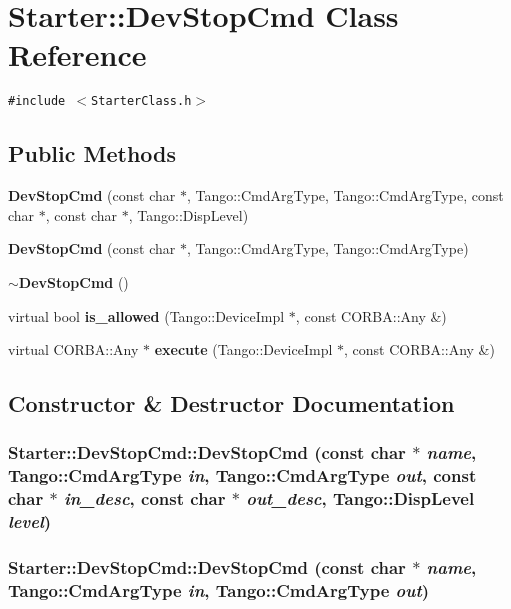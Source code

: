 \section{Starter::Dev\-Stop\-Cmd  Class Reference}
\label{classStarter_1_1DevStopCmd}
{\tt \#include $<$Starter\-Class.h$>$}

\subsection*{Public Methods}
\begin{CompactItemize}
\item 
{\bf Dev\-Stop\-Cmd} (const char $\ast$, Tango::Cmd\-Arg\-Type, Tango::Cmd\-Arg\-Type, const char $\ast$, const char $\ast$, Tango::Disp\-Level)
\item 
{\bf Dev\-Stop\-Cmd} (const char $\ast$, Tango::Cmd\-Arg\-Type, Tango::Cmd\-Arg\-Type)
\item 
{\bf $\sim$Dev\-Stop\-Cmd} ()
\item 
virtual bool {\bf is\_\-allowed} (Tango::Device\-Impl $\ast$, const CORBA::Any \&)
\item 
virtual CORBA::Any $\ast$ {\bf execute} (Tango::Device\-Impl $\ast$, const CORBA::Any \&)
\end{CompactItemize}


\subsection{Constructor \& Destructor Documentation}
\subsubsection{\setlength{\rightskip}{0pt plus 5cm}Starter::Dev\-Stop\-Cmd::Dev\-Stop\-Cmd (const char $\ast$ {\em name}, Tango::Cmd\-Arg\-Type {\em in}, Tango::Cmd\-Arg\-Type {\em out}, const char $\ast$ {\em in\_\-desc}, const char $\ast$ {\em out\_\-desc}, Tango::Disp\-Level {\em level})}\label{classStarter_1_1DevStopCmd_a0}


\subsubsection{\setlength{\rightskip}{0pt plus 5cm}Starter::Dev\-Stop\-Cmd::Dev\-Stop\-Cmd (const char $\ast$ {\em name}, Tango::Cmd\-Arg\-Type {\em in}, Tango::Cmd\-Arg\-Type {\em out})}\label{classStarter_1_1DevStopCmd_a1}



